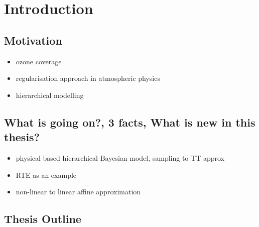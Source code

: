 \chapter{Introduction}
\section{Motivation}
\begin{itemize}
	\item ozone coverage
	\item regularisation approach in atmospheric physics
	\item hierarchical modelling
\end{itemize}
\section{What is going on?, 3 facts, What is new in this thesis?}
\begin{itemize}
	\item physical based hierarchical Bayesian model, sampling to TT approx
	\item RTE as an example
	\item non-linear to linear affine approximation
\end{itemize}

\section{Thesis Outline}

